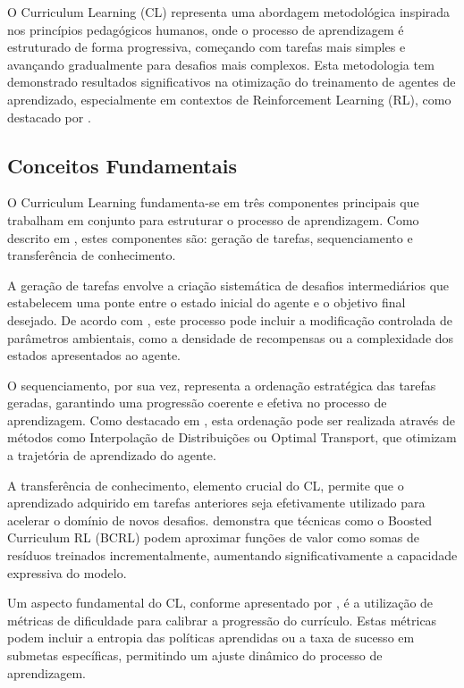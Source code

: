 O Curriculum Learning (CL) representa uma abordagem metodológica inspirada nos princípios pedagógicos humanos, onde o processo de aprendizagem é estruturado de forma progressiva, começando com tarefas mais simples e avançando gradualmente para desafios mais complexos. Esta metodologia tem demonstrado resultados significativos na otimização do treinamento de agentes de aprendizado, especialmente em contextos de Reinforcement Learning (RL), como destacado por \cite{https://arxiv.org/abs/2101.10382}.

\subsection{Conceitos Fundamentais}
\label{subsec:curriculum_conceitos}

O Curriculum Learning fundamenta-se em três componentes principais que trabalham em conjunto para estruturar o processo de aprendizagem. Como descrito em \cite{https://openreview.net/forum?id=anbBFlX1tJ1}, estes componentes são: geração de tarefas, sequenciamento e transferência de conhecimento.

A geração de tarefas envolve a criação sistemática de desafios intermediários que estabelecem uma ponte entre o estado inicial do agente e o objetivo final desejado. De acordo com \cite{https://proceedings.mlr.press/v162/klink22a/klink22a.pdf}, este processo pode incluir a modificação controlada de parâmetros ambientais, como a densidade de recompensas ou a complexidade dos estados apresentados ao agente.

O sequenciamento, por sua vez, representa a ordenação estratégica das tarefas geradas, garantindo uma progressão coerente e efetiva no processo de aprendizagem. Como destacado em \cite{https://jmlr.org/papers/volume21/20-212/20-212.pdf}, esta ordenação pode ser realizada através de métodos como Interpolação de Distribuições ou Optimal Transport, que otimizam a trajetória de aprendizado do agente.

A transferência de conhecimento, elemento crucial do CL, permite que o aprendizado adquirido em tarefas anteriores seja efetivamente utilizado para acelerar o domínio de novos desafios. \cite{https://openreview.net/forum?id=yRhrVaDOWE} demonstra que técnicas como o Boosted Curriculum RL (BCRL) podem aproximar funções de valor como somas de resíduos treinados incrementalmente, aumentando significativamente a capacidade expressiva do modelo.

Um aspecto fundamental do CL, conforme apresentado por \cite{https://zilliz.com/ai-faq/what-is-curriculum-learning-in-reinforcement-learning}, é a utilização de métricas de dificuldade para calibrar a progressão do currículo. Estas métricas podem incluir a entropia das políticas aprendidas ou a taxa de sucesso em submetas específicas, permitindo um ajuste dinâmico do processo de aprendizagem.

